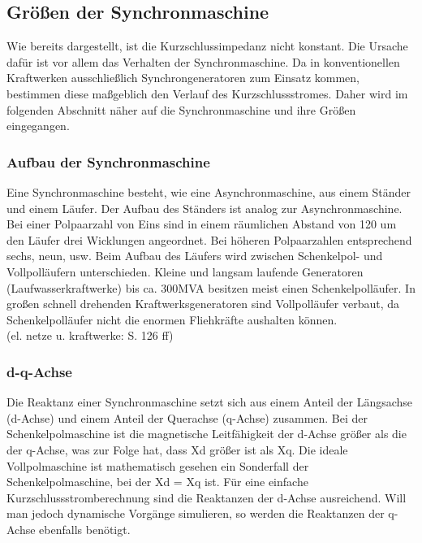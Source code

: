 \documentclass{scrartcl}
\begin{document}
\begin{onehalfspace}
\subsection{Größen der Synchronmaschine}
Wie bereits dargestellt, ist die Kurzschlussimpedanz nicht konstant. Die Ursache dafür ist vor allem das Verhalten der Synchronmaschine. Da in konventionellen Kraftwerken ausschließlich Synchrongeneratoren zum Einsatz kommen, bestimmen diese maßgeblich den Verlauf des Kurzschlussstromes. Daher wird im folgenden Abschnitt näher auf die Synchronmaschine und ihre Größen eingegangen.

\subsubsection{Aufbau der Synchronmaschine}
Eine Synchronmaschine besteht, wie eine Asynchronmaschine, aus einem Ständer und einem Läufer. Der Aufbau des Ständers ist analog zur Asynchronmaschine. Bei einer Polpaarzahl von Eins sind in einem räumlichen Abstand von 120\degree{} um den Läufer drei Wicklungen angeordnet. Bei höheren Polpaarzahlen entsprechend sechs, neun, usw. Beim Aufbau des Läufers wird zwischen Schenkelpol- und Vollpolläufern unterschieden. Kleine und langsam laufende Generatoren (Laufwasserkraftwerke) bis ca. 300MVA besitzen meist einen Schenkelpolläufer. In großen schnell drehenden Kraftwerksgeneratoren sind Vollpolläufer verbaut, da Schenkelpolläufer nicht die enormen Fliehkräfte aushalten können. 
\\ (el. netze u. kraftwerke: S. 126 ff)

\subsubsection{d-q-Achse}
Die Reaktanz einer Synchronmaschine setzt sich aus einem Anteil der Längsachse (d-Achse) und einem Anteil der Querachse (q-Achse) zusammen. Bei der Schenkelpolmaschine ist die magnetische Leitfähigkeit der d-Achse größer als die der q-Achse, was zur Folge hat, dass Xd größer ist als Xq. Die ideale Vollpolmaschine ist mathematisch gesehen ein Sonderfall der Schenkelpolmaschine, bei der Xd = Xq ist. Für eine einfache Kurzschlussstromberechnung sind die Reaktanzen der d-Achse ausreichend. Will man jedoch dynamische Vorgänge simulieren, so werden die Reaktanzen der q-Achse ebenfalls benötigt. \\


\end{onehalfspace}
\end{document}
